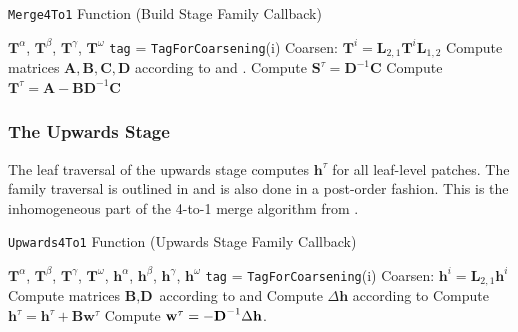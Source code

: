 \begin{algorithm}
    \caption{\texttt{Merge4To1} Function (Build Stage Family Callback)}
    \begin{algorithmic}[0]
        \Require $\textbf{T}^{\alpha}$, $\textbf{T}^{\beta}$, $\textbf{T}^{\gamma}$, $\textbf{T}^{\omega}$
            \State \texttt{tag} = \texttt{TagForCoarsening}(i)
                \State Coarsen: $\textbf{T}^{i} = \textbf{L}_{2,1} \textbf{T}^{i} \textbf{L}_{1,2}$
            \EndIf
        \EndFor
        \State Compute matrices $\textbf{A}, \textbf{B}, \textbf{C}, \textbf{D}$ according to  and .
        \State Compute $\textbf{S}^{\tau} = \textbf{D}^{-1} \textbf{C}$
        \State Compute $\textbf{T}^{\tau} = \textbf{A} - \textbf{B} \textbf{D}^{-1} \textbf{C}$
    \end{algorithmic}
    \label{alg:build_merge}
\end{algorithm}

\subsubsection{The Upwards Stage}

The leaf traversal of the upwards stage computes $\textbf{h}^{\tau}$ for all leaf-level patches. The family traversal is outlined in  and is also done in a post-order fashion. This is the inhomogeneous part of the 4-to-1 merge algorithm from .

\begin{algorithm}
    \caption{\texttt{Upwards4To1} Function (Upwards Stage Family Callback)}
    \begin{algorithmic}[0]
        \Require $\textbf{T}^{\alpha}$, $\textbf{T}^{\beta}$, $\textbf{T}^{\gamma}$, $\textbf{T}^{\omega}$, $\textbf{h}^{\alpha}$, $\textbf{h}^{\beta}$, $\textbf{h}^{\gamma}$, $\textbf{h}^{\omega}$
        \State \texttt{tag} = \texttt{TagForCoarsening}(i)
        \State Coarsen: $\textbf{h}^{i} = \textbf{L}_{2,1} \textbf{h}^{i}$
        \EndIf
        \EndFor
        \State Compute matrices $\textbf{B}, \textbf{D}$ according to  and 
        \State Compute $\Delta \textbf{h}$ according to 
        \State Compute $\textbf{h}^{\tau} = \textbf{h}^{\tau} + \textbf{B} \textbf{w}^{\tau}$
        \State Compute $\textbf{w}^{\tau} = -\textbf{D}^{-1} \Delta \mathbf h$.
    \end{algorithmic}
    \label{alg:upwards_merge}
\end{algorithm}

